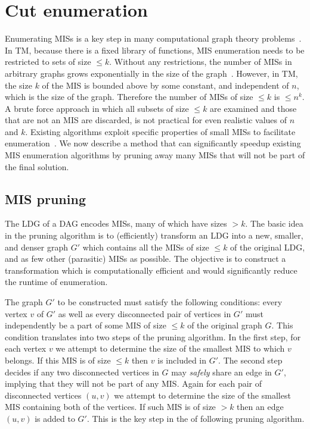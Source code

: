 \documentclass[journal]{IEEEtran}
\begin{document}
\section{Cut enumeration}

Enumerating MISs is a key step in many computational graph theory problems~\cite{eppstein2001small,byskov2003algorithms,byskov2004enumerating}.  In TM, because there is a fixed library of functions, MIS enumeration needs to be restricted to sets of size $\leq k$.  Without any restrictions, the number of MISs in arbitrary graphs grows exponentially in the size of the graph~\cite{byskov2004enumerating}.  However, in TM, the size $k$ of the MIS is bounded above by some constant, and independent of $n$, which is the size of the graph. Therefore the number of MISs of size $\leq k$ is $\leq n^k$.  A brute force approach in which all subsets of size $\leq k$ are examined and those that are not an MIS are discarded, is not practical for even realistic values of $n$ and $k$. Existing algorithms exploit specific properties of small MISs to facilitate enumeration~\cite{eppstein2001small}. We now describe a method that can significantly speedup existing MIS enumeration algorithms by  pruning away many MISs that will not be part of the final solution. 

\subsection{MIS pruning}
The LDG of a DAG encodes MISs, many of which have sizes $> k$.  The basic idea in the pruning algorithm is to (efficiently) transform an LDG into a new, smaller, and denser graph $G'$ which contains all the MISs of size $\leq k$ of the original LDG, and as few other (parasitic) MISs as possible.  The objective is to construct a transformation which is computationally efficient and would significantly reduce the runtime of enumeration.

The graph $G'$ to be constructed must satisfy the  following conditions: every vertex $v$ of $G'$ as well as every disconnected pair of vertices in $G'$ must independently be a part of some MIS of size $\leq k$ of the original graph $G$. This condition  translates into two steps of the pruning algorithm. In the first step, for each vertex $v$ we attempt to determine the size of the smallest MIS to which $v$ belongs. If this MIS is of size $\leq k$ then $v$ is included in $G'$. The second step decides if any two disconnected vertices in $G$ may \textit{safely} share an edge in $G'$, implying that they will not be part of any MIS.  Again for each pair of disconnected vertices $(u, v)$ we attempt to determine the size of the smallest MIS containing both of the vertices. If such MIS is of size $> k$ then an edge $(u, v)$ is added to $G'$. This is the key step in the  of following pruning algorithm.
\end{document}
